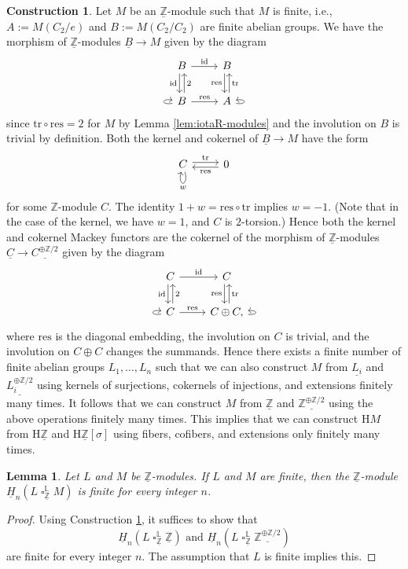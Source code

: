 \documentclass[10pt]{amsart}
\newtheorem{lem}[thm]{Lemma}
\theoremstyle{definition}
\newtheorem{const}[thm]{Construction}
\numberwithin{equation}{section}
\renewcommand{\L}{\mathbb{L}}
\newcommand{\Z}{\mathbb{Z}}
\newcommand{\rH}{\mathrm{H}}
\newcommand{\ul}{\underline}
\newcommand{\id}{\mathrm{id}}
\DeclareMathOperator{\sotimes}{\square}
\newcommand{\tr}{\mathrm{tr}}
\newcommand{\res}{\mathrm{res}}
\begin{document}
\begin{const}
\label{const:finite Mackey}
Let $M$ be an $\ul{\Z}$-module such that $M$ is finite, i.e.,
$A:=M(C_2/e)$ and $B:=M(C_2/C_2)$ are finite abelian groups.
We have the morphism of $\ul{\Z}$-modules $\ul{B}\to M$ given by the diagram
\[
\begin{tikzcd}
B
\ar[r,"\id"]
\ar[d,"\id"',shift right=0.5ex]
\ar[d,"2",shift left=0.5ex,leftarrow]
&
B
\ar[d,"\res"',shift right=0.5ex]\ar[d,"\tr",shift left=0.5ex,leftarrow]
\\
B
\ar[r,"\res"]
\ar[loop,out=190, in=170,looseness=9]
&
A
\ar[loop,out=350, in=10,looseness=9]
\end{tikzcd}
\]
since $\tr\circ \res=2$ for $M$ by Lemma \ref{lem:iotaR-modules}
and the involution on $B$ is trivial by definition.
Both the kernel and cokernel of $\ul{B}\to M$ have the form
\[
\begin{tikzcd}
C\ar[loop below,"w"]\ar[r,shift left=0.5ex,"\tr"]\ar[r,shift right=0.5ex,leftarrow,"\res"']&
0
\end{tikzcd}
\]
for some $\Z$-module $C$.
The identity $1+w=\res\circ \tr$ implies $w=-1$.
(Note that in the case of the kernel, we have $w=1$, and $C$ is $2$-torsion.)
Hence both the kernel and cokernel Mackey functors are the cokernel of the morphism of $\ul{\Z}$-modules $\ul{C}\to \ul{C^{\oplus \Z/2}}$ given by the diagram
\[
\begin{tikzcd}
C
\ar[r,"\id"]
\ar[d,"\id"',shift right=0.5ex]
\ar[d,"2",shift left=0.5ex,leftarrow]
&
C
\ar[d,"\res"',shift right=0.5ex]\ar[d,"\tr",shift left=0.5ex,leftarrow]
\\
C
\ar[r,"\res"]
\ar[loop,out=190, in=170,looseness=9]
&
C\oplus C,
\ar[loop,out=355, in=5,looseness=7]
\end{tikzcd}
\]
where $\res$ is the diagonal embedding,
the involution on $C$ is trivial,
and the involution on $C\oplus C$ changes the summands.
Hence there exists a finite number of finite abelian groups $L_1,\ldots,L_n$ such that we can also construct $M$ from $\ul{L_i}$ and $\ul{L_i^{\oplus \Z/2}}$ using kernels of surjections, cokernels of injections, and extensions finitely many times.
It follows that we can construct $M$ from $\ul{\Z}$ and $\ul{\Z^{\oplus \Z/2}}$ using the above operations finitely many times.
This implies that we can construct $\rH M$ from $\rH \ul{\Z}$ and $\rH \ul{\Z}[\sigma]$ using fibers, cofibers, and extensions only  finitely many times.
\end{const}

\begin{lem}
\label{finite derived tensor}
Let $L$ and $M$ be $\ul{\Z}$-modules.
If $L$ and $M$ are finite,
then the $\ul{\Z}$-module $\ul{H}_n(L\sotimes_{\ul{\Z}}^\L M)$ is finite for every integer $n$.
\end{lem}
\begin{proof}
Using Construction \ref{const:finite Mackey},
it suffices to show that
\[
\ul{H}_n(L\sotimes_{\ul{\Z}}^\L \ul{\Z})
\text{ and }
\ul{H}_n(L\sotimes_{\ul{\Z}}^\L \ul{\Z^{\oplus \Z/2}})
\]
are finite for every integer $n$.
The assumption that $L$ is finite implies this.
\end{proof}
\end{document}
